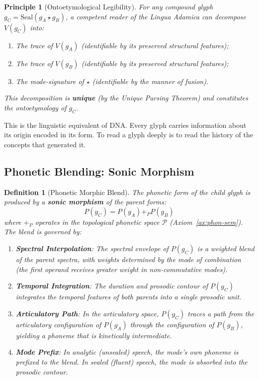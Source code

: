 \documentclass[12pt, letterpaper]{book}
\def\equiv{=}%
\def\oplus{+}%
\def\mathfrak#1{#1}%
\newtheorem{definition}{Definition}[chapter]
\newtheorem{principle}{Principle}[chapter]
\begin{document}
\begin{principle}[Ontoetymological Legibility]\label{pr:legibility}
For any compound glyph $\mathfrak{g}_C \equiv \mathrm{Seal}(\mathfrak{g}_A \star \mathfrak{g}_B)$, a competent reader of the Lingua Adamica can decompose $V(\mathfrak{g}_C)$ into:
\begin{enumerate}[label=(\roman*)]
    \item The trace of $V(\mathfrak{g}_A)$ (identifiable by its preserved structural features);
    \item The trace of $V(\mathfrak{g}_B)$ (identifiable by its preserved structural features);
    \item The mode-signature of $\star$ (identifiable by the manner of fusion).
\end{enumerate}
This decomposition is \textbf{unique} (by the Unique Parsing Theorem) and constitutes the ontoetymology of $\mathfrak{g}_C$.
\end{principle}

This is the linguistic equivalent of DNA. Every glyph carries information about its origin encoded in its form. To read a glyph deeply is to read the history of the concepts that generated it.


\subsection{Phonetic Blending: Sonic Morphism}

\begin{definition}[Phonetic Morphic Blend]\label{def:phonetic-blend}
The phonetic form of the child glyph is produced by a \textbf{sonic morphism} of the parent forms:
\[
P(\mathfrak{g}_C) \equiv P(\mathfrak{g}_A) \oplus_P P(\mathfrak{g}_B)
\]
where $\oplus_P$ operates in the topological phonetic space $\mathcal{P}$ (Axiom~\ref{ax:phon-sem}). The blend is governed by:

\begin{enumerate}[label=(\roman*)]
    \item \textbf{Spectral Interpolation}: The spectral envelope of $P(\mathfrak{g}_C)$ is a weighted blend of the parent spectra, with weights determined by the mode of combination (the first operand receives greater weight in non-commutative modes).
    \item \textbf{Temporal Integration}: The duration and prosodic contour of $P(\mathfrak{g}_C)$ integrates the temporal features of both parents into a single prosodic unit.
    \item \textbf{Articulatory Path}: In the articulatory space, $P(\mathfrak{g}_C)$ traces a path from the articulatory configuration of $P(\mathfrak{g}_A)$ through the configuration of $P(\mathfrak{g}_B)$, yielding a phoneme that is kinetically intermediate.
    \item \textbf{Mode Prefix}: In analytic (unsealed) speech, the mode's own phoneme is prefixed to the blend. In sealed (fluent) speech, the mode is absorbed into the prosodic contour.
\end{enumerate}
\end{definition}
\end{document}
